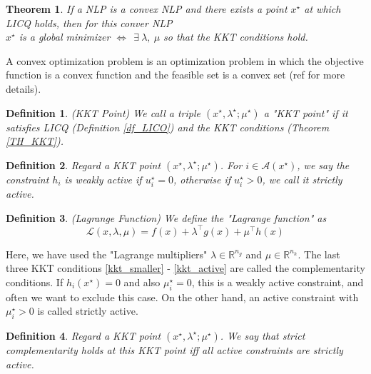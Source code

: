 \documentclass  [
  paper    = a4,
  BCOR     = 10mm,
  twoside,
  fontsize = 12pt,
  fleqn,
  toc      = bibnumbered,
  toc      = listofnumbered,
  numbers  = noendperiod,
  headings = normal,
  listof   = leveldown,
  version  = 3.03
]                                       {scrreprt}
\newcommand{\<}{\langle}
\renewcommand{\>}{\rangle}
\newtheorem{theorem}{Theorem}
\newtheorem{definition}{Definition}
\begin{document}
\begin{theorem} If a NLP is a convex NLP and there exists a point $x^\star$ at which LICQ holds, then for this conver NLP \\
	$x^\star$ is a global minimizer $\Longleftrightarrow \  \	\exists \ \lambda ,\  \mu $ so that the KKT conditions hold.
\end{theorem}

A convex optimization problem is an optimization problem in which the objective function is a convex function and the feasible set is a convex set (ref \cite{JorSte06} for more details). 
\begin{definition}(KKT Point)
	We call a triple $(x^\star, \lambda^\star; \mu^\star)$ a "KKT point" if it satisfies LICQ (Definition \ref{df_LICO}) and the KKT conditions (Theorem \ref{TH_KKT}).
\end{definition}


\begin{definition}
Regard a KKT point $(x^\star, \lambda^\star; \mu^\star)$. For $i \in \mathcal{A}(x^\star)$, we say the constraint $h_i$ is weakly active if $u_i^\star=0$, otherwise if  $u_i^\star>0$, we call it strictly active. 	
\end{definition}	

\begin{definition}(Lagrange Function)
	We define the "Lagrange function" as
	\begin{equation}
		\mathcal{L}(x,\lambda, \mu) = f(x) + \lambda^\top g(x) +  \mu^\top h(x) 
		\label{eq_Lagrangian}
	\end{equation}
\end{definition}
Here, we have used the "Lagrange multipliers" $\lambda \in \mathbb{R}^{n_g}$ and $\mu \in \mathbb{R}^{n_h}$. 
The last three KKT conditions \ref{kkt_smaller} - \ref{kkt_active} are called the complementarity conditions.  
If  $h_i(x^\star)=0$ and also $\mu_i^\star = 0$, this is a weakly active constraint, and often we want to exclude this case. On the other hand, an active constraint with $\mu_i^\star > 0$ is called strictly active.

\begin{definition}
	Regard a KKT point $(x^\star, \lambda^\star; \mu^\star)$. We say that strict complementarity holds at this KKT point iff all active constraints are strictly active.
\end{definition}
\end{document}
